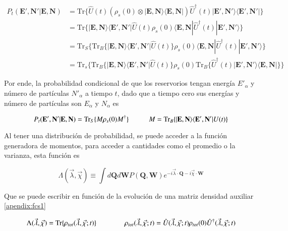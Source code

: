 \begin{align*} 
    P_{t}(\textbf{E}',\textbf{N}'|\textbf{E},\textbf{N}) & =  \text{Tr}\{\hat{U}(t)(\rho_{s}(0)\otimes |\textbf{E}, \textbf{N}\rangle  \langle \textbf{E}, \textbf{N}| ) \hat{U}^{\dagger}(t)  |\textbf{E}', \textbf{N}'\rangle  \langle \textbf{E}', \textbf{N}'| \} \\
        & =  \text{Tr}\{|\textbf{E},\textbf{N} \rangle \langle \textbf{E}', \textbf{N}'| \hat{U}(t)\rho_{s}(0) \langle \textbf{E}, \textbf{N}|\hat{U}^{\dagger}(t)|\textbf{E}', \textbf{N}'\rangle \}      \\ 
        & = \text{Tr}_{S}\{ \text{Tr}_{B}\{|\textbf{E},\textbf{N} \rangle \langle \textbf{E}', \textbf{N}'|\hat{U}(t) \}\rho_{s}(0)\langle \textbf{E}, \textbf{N}|\hat{U}^{\dagger}(t)|\textbf{E}', \textbf{N}'\rangle      \} \\
        & = \text{Tr}_{s}\{ \text{Tr}_{B}\{|\textbf{E},\textbf{N}\rangle \langle \textbf{E}',\textbf{N}'|\hat{U}(t)  \} \rho_{s}(0) \text{Tr}_{B}\{\hat{U}^{\dagger}(t) |\textbf{E}',\textbf{N}' \rangle \langle \textbf{E},\textbf{N}| \}     \}
    \end{align*}    

Por ende, la probabilidad condicional de que los reservorios tengan energía $E'_{\alpha}$ y número de partículas $N'_{\alpha}$ a tiempo $t$, dado que a tiempo cero sus energías y número de partículas son $E_{\alpha}$ y $N_{\alpha}$ es

\begin{equation*}
    P_{t}(\textbf{E}',\textbf{N}'|\textbf{E},\textbf{N}) = \text{Tr}_{S}\{M \rho_{s}(0)M^{\dagger} \}  \hspace{10mm} M = \text{Tr}_{B}\{|\textbf{E},\textbf{N} \rangle \langle \textbf{E}',\textbf{N}' | U(t)\}
\end{equation*}

Al tener una distribución de probabilidad, se puede acceder a la función generadora de momentos, para acceder a cantidades como el promedio o la varianza, esta función es

\begin{equation}
    \Lambda(\vec{\lambda},\vec{\chi}) \equiv \int d\textbf{Q} d\textbf{W}P(\textbf{Q},\textbf{W}) e^{-i\vec{\lambda}\cdot \textbf{Q} -i\vec{\chi}\cdot \textbf{W} }
\label{sec2funciongeneradora}
\end{equation}

Que se puede escribir en función de la evolución de una matriz densidad auxiliar \ref{apendix:fcs1}

\begin{equation}
    \Lambda(\vec{\lambda},\vec{\chi}) = \text{Tr}\{\rho_{tot}(\vec{\lambda},\vec{\chi};t) \}    \hspace{14mm} \rho_{tot}(\vec{\lambda},\vec{\chi};t) = \hat{U}(\vec{\lambda},\vec{\chi};t) \rho_{tot}(0) \hat{U}^{\dagger}(\vec{\lambda},\vec{\chi};t)
    \label{sec2:evolucionconteo}
\end{equation}

